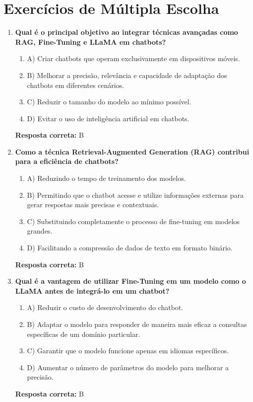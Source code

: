 \documentclass[14pt,a4paper,oneside]{book}
\begin{document}
\section*{Exercícios de Múltipla Escolha}

\begin{enumerate}
	
	\item \textbf{Qual é o principal objetivo ao integrar técnicas avançadas como RAG, Fine-Tuning e LLaMA em chatbots?}
	\begin{enumerate}[label=\alph*)]
		\item A) Criar chatbots que operam exclusivamente em dispositivos móveis.
		\item B) Melhorar a precisão, relevância e capacidade de adaptação dos chatbots em diferentes cenários.
		\item C) Reduzir o tamanho do modelo ao mínimo possível.
		\item D) Evitar o uso de inteligência artificial em chatbots.
	\end{enumerate}
	\vspace{5mm}
	\textbf{Resposta correta:} B
	
	\item \textbf{Como a técnica Retrieval-Augmented Generation (RAG) contribui para a eficiência de chatbots?}
	\begin{enumerate}[label=\alph*)]
		\item A) Reduzindo o tempo de treinamento dos modelos.
		\item B) Permitindo que o chatbot acesse e utilize informações externas para gerar respostas mais precisas e contextuais.
		\item C) Substituindo completamente o processo de fine-tuning em modelos grandes.
		\item D) Facilitando a compressão de dados de texto em formato binário.
	\end{enumerate}
	\vspace{5mm}
	\textbf{Resposta correta:} B
	
	\item \textbf{Qual é a vantagem de utilizar Fine-Tuning em um modelo como o LLaMA antes de integrá-lo em um chatbot?}
	\begin{enumerate}[label=\alph*)]
		\item A) Reduzir o custo de desenvolvimento do chatbot.
		\item B) Adaptar o modelo para responder de maneira mais eficaz a consultas específicas de um domínio particular.
		\item C) Garantir que o modelo funcione apenas em idiomas específicos.
		\item D) Aumentar o número de parâmetros do modelo para melhorar a precisão.
	\end{enumerate}
	\vspace{5mm}
	\textbf{Resposta correta:} B
	

\end{enumerate}
\end{document}
